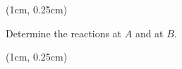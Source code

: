 \documentclass[9pt, xcolor={svgnames, x11names},professionalfonts]{beamer}
\def\scale{1}
\begin{document}
\begin{frame}
	\begin{textblock*}{1\textwidth}(1cm, 0.25cm)

		\begin{myexam}{}{}
			\centering
			\def\scale{0.55}
			
			\parb
			Determine the reactions at $A$ and at $B$.
		\end{myexam}
	\end{textblock*}

\end{frame}

\begin{frame}
	\begin{textblock*}{1\textwidth}(1cm, 0.25cm)

		\begin{myexer}{}{}
			\def\scale{0.8}
			\centering
			
		\end{myexer}
	\end{textblock*}

\end{frame}

\end{document}
